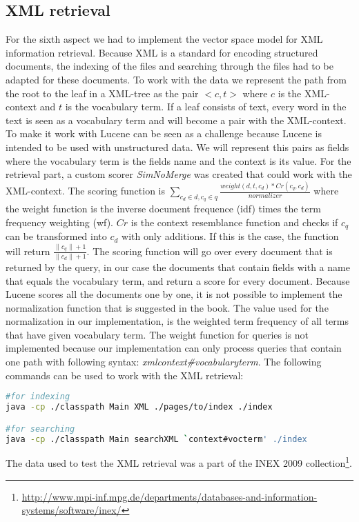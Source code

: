 \documentclass{article}
\begin{document}
\subsection{XML retrieval}
For the sixth aspect we had to implement the vector space model for XML information retrieval.
Because XML is a standard for encoding structured documents, the indexing of the files and searching
through the files had to be adapted for these documents. To work with the data we represent the path from the root to
the leaf in a XML-tree as the pair $<c,t>$ where $c$ is the XML-context and $t$ is the vocabulary term. If a leaf consists
of text, every word in the text is seen as a vocabulary term and will become a pair with the XML-context.
To make it work with Lucene can be seen as a challenge because Lucene is intended to be used with unstructured data.
We will represent this pairs as fields where the vocabulary term is the fields name and the context is its value.
For the retrieval part, a custom scorer \emph{SimNoMerge} was created that could work with the XML-context.
The scoring function is $\sum_{c_{d} \in d, c_{q} \in q}\frac{weight(d,t,c_{d}) * Cr(c_{q}, c_{d})}{normalizer}$ where the weight function is the
inverse document frequence (idf) times the term frequency weighting (wf). $Cr$ is the context resemblance function and checks
if $c_{q}$ can be transformed into $c_{d}$ with only additions. If this is the case, the function will return $\frac{\|c_{q}\| + 1}{\|c_{d}\| + 1}$.
The scoring function will go over every document that is returned by the query, in our case the documents that contain
fields with a name that equals the vocabulary term, and return a score for every document.
Because Lucene scores all the documents one by one, it is not possible to implement the normalization function that is
suggested in the book. The value used for the normalization in our implementation, is the weighted term frequency of all terms
that have given vocabulary term.
The weight function for queries is not implemented because our implementation can only process queries that contain one
path with following syntax: \emph{xml\/context\#vocabularyterm}.
The following commands can be used to work with the XML retrieval:
\begin{lstlisting}[language=Bash, label={lst:search}]
#for indexing
java -cp ./classpath Main XML ./pages/to/index ./index

#for searching
java -cp ./classpath Main searchXML `context#vocterm' ./index
\end{lstlisting}
The data used to test the XML retrieval was a part of the INEX 2009 collection\footnote{\url{http://www.mpi-inf.mpg.de/departments/databases-and-information-systems/software/inex/}}.
\end{document}
